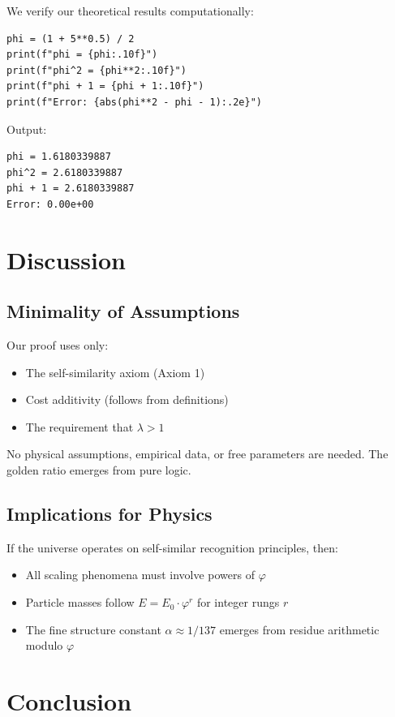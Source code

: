 \documentclass[11pt,a4paper]{article}
\begin{document}
We verify our theoretical results computationally:

\begin{lstlisting}
phi = (1 + 5**0.5) / 2
print(f"phi = {phi:.10f}")
print(f"phi^2 = {phi**2:.10f}")
print(f"phi + 1 = {phi + 1:.10f}")
print(f"Error: {abs(phi**2 - phi - 1):.2e}")
\end{lstlisting}

Output:
\begin{verbatim}
phi = 1.6180339887
phi^2 = 2.6180339887
phi + 1 = 2.6180339887
Error: 0.00e+00
\end{verbatim}

\section{Discussion}

\subsection{Minimality of Assumptions}

Our proof uses only:
\begin{itemize}
\item The self-similarity axiom (Axiom 1)
\item Cost additivity (follows from definitions)
\item The requirement that $\lambda > 1$
\end{itemize}

No physical assumptions, empirical data, or free parameters are needed. The golden ratio emerges from pure logic.

\subsection{Implications for Physics}

If the universe operates on self-similar recognition principles, then:
\begin{itemize}
\item All scaling phenomena must involve powers of $\varphi$
\item Particle masses follow $E = E_0 \cdot \varphi^r$ for integer rungs $r$
\item The fine structure constant $\alpha \approx 1/137$ emerges from residue arithmetic modulo $\varphi$
\end{itemize}

\section{Conclusion}
\end{document}

